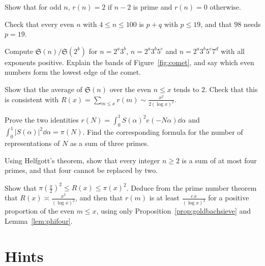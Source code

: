 \begin{exercise}[$\star$]\label{ex:oddr}
Show that for odd $n$, $r(n)=2$ if $n-2$ is prime and $r(n)=0$ otherwise.
\end{exercise}

\begin{exercise}[$\star$]\label{ex:smallgoldbach}
Check that every even $n$ with $4\le n\le100$ is $p+q$ with $p\le19$, and that $98$ needs $p=19$.
\end{exercise}

\begin{exercise}[$\star$]\label{ex:bands}
Compute $\mathfrak S(n)/\mathfrak S(2^k)$ for $n=2^a3^b$, $n=2^a3^b5^c$ and $n=2^a3^b5^c7^d$ with all exponents positive. Explain the bands of
Figure~\ref{fig:comet}, and say which even numbers form the lowest edge of the comet.
\end{exercise}

\begin{exercise}[$\star\star$]\label{ex:singavg}
Show that the average of $\mathfrak S(n)$ over the even $n\le x$ tends to $2$. Check that this is consistent with $R(x)=\sum_{m\le x}r(m)\sim\frac{x^2}{2(\log x)^2}$.
\end{exercise}

\begin{exercise}[$\star$]\label{ex:parseval}
Prove the two identities $r(N)=\int_0^1S(\alpha)^2e(-N\alpha)\dd\alpha$ and $\int_0^1|S(\alpha)|^2\dd\alpha=\pi(N)$. Find the corresponding formula for the
number of representations of $N$ as a sum of three primes.
\end{exercise}

\begin{exercise}[$\star$]\label{ex:fourprimes}
Using Helfgott's theorem, show that every integer $n\ge2$ is a sum of at most four primes, and that four cannot be replaced by two.
\end{exercise}

\begin{exercise}[$\star\star$]\label{ex:sumbounds}
Show that $\pi(\frac x2)^2\le R(x)\le\pi(x)^2$. Deduce from the prime number theorem that $R(x)\asymp\frac{x^2}{(\log x)^2}$, and then that $r(m)$ is at least
$\frac{c\,x}{(\log x)^2}$ for a positive proportion of the even $m\le x$, using only Proposition~\ref{prop:goldbachsieve} and Lemma~\ref{lem:phifour}.
\end{exercise}

\section{Hints}

